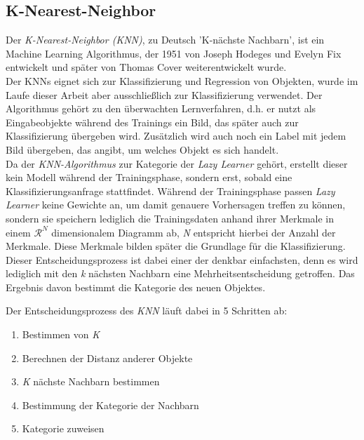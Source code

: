 \subsection{K-Nearest-Neighbor} \label{ssec:knn}
Der \textit{K-Nearest-Neighbor (KNN)}, zu Deutsch 'K-nächste Nachbarn', ist ein Machine Learning Algorithmus, der 1951 von Joseph Hodeges und Evelyn Fix entwickelt und später von Thomas Cover weiterentwickelt wurde.\\\hfill
Der \acp{KNN} eignet sich zur Klassifizierung und Regression von Objekten, wurde im Laufe dieser Arbeit aber ausschließlich zur Klassifizierung verwendet. Der Algorithmus gehört zu den überwachten Lernverfahren, d.h. er nutzt als Eingabeobjekte während des Trainings ein Bild, das später auch zur Klassifizierung übergeben wird. Zusätzlich wird auch noch ein Label mit jedem Bild übergeben, das angibt, um welches Objekt es sich handelt. \\\hfill
Da der \textit{KNN-Algorithmus} zur Kategorie der \textit{Lazy Learner} gehört, erstellt dieser kein Modell während der Trainingsphase, sondern erst, sobald eine Klassifizierungsanfrage stattfindet. Während der Trainingsphase passen \textit{Lazy Learner} keine Gewichte an, um damit genauere Vorhersagen treffen zu können, sondern sie speichern lediglich die Trainingsdaten anhand ihrer Merkmale in einem $\mathcal{R}^N$ dimensionalem Diagramm ab, \textit{N} entspricht hierbei der Anzahl der Merkmale. Diese Merkmale bilden später die Grundlage für die Klassifizierung. Dieser Entscheidungsprozess ist dabei einer der denkbar einfachsten, denn es wird lediglich mit den \textit{k} nächsten Nachbarn eine Mehrheitsentscheidung getroffen. Das Ergebnis davon bestimmt die Kategorie des neuen Objektes.\par

Der Entscheidungsprozess des \textit{KNN} läuft dabei in 5 Schritten ab:
\begin{enumerate}
    \item Bestimmen von \textit{K}
    \item Berechnen der Distanz anderer Objekte
    \item \textit{K} nächste Nachbarn bestimmen
    \item Bestimmung der Kategorie der Nachbarn
    \item Kategorie zuweisen
\end{enumerate}

